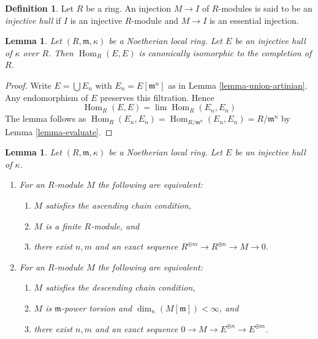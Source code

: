 \documentclass{amsart}
\theoremstyle{plain}
\newtheorem{lemma}[subsection]{Lemma}
\theoremstyle{definition}
\newtheorem{definition}[subsection]{Definition}
\theoremstyle{remark}
\numberwithin{equation}{subsection}
\def\lim{\mathop{\mathrm{lim}}\nolimits}
\def\Hom{\mathop{\mathrm{Hom}}\nolimits}
\begin{document}
\begin{definition}
\label{definition-injective-hull}
Let $R$ be a ring. An injection $M \to I$ of $R$-modules is said
to be an {\it injective hull} if $I$ is an injective $R$-module and
$M \to I$ is an essential injection.
\end{definition}

\begin{lemma}
\label{lemma-endos}
Let $(R, \mathfrak m, \kappa)$ be a Noetherian local ring.
Let $E$ be an injective hull of $\kappa$ over $R$. Then
$\Hom_R(E, E)$ is canonically isomorphic to the completion of $R$.
\end{lemma}

\begin{proof}
Write $E = \bigcup E_n$ with $E_n = E[\mathfrak m^n]$ as in
Lemma \ref{lemma-union-artinian}. Any endomorphism of $E$
preserves this filtration. Hence
$$
\Hom_R(E, E) = \lim \Hom_R(E_n, E_n)
$$
The lemma follows as
$\Hom_R(E_n, E_n) = \Hom_{R/\mathfrak m^n}(E_n, E_n) = R/\mathfrak m^n$
by Lemma \ref{lemma-evaluate}.
\end{proof}


\begin{lemma}
\label{lemma-describe-categories}
Let $(R, \mathfrak m, \kappa)$ be a Noetherian local ring.
Let $E$ be an injective hull of $\kappa$.
\begin{enumerate}
\item For an $R$-module $M$ the following are equivalent:
\begin{enumerate}
\item $M$ satisfies the ascending chain condition,
\item $M$ is a finite $R$-module, and
\item there exist $n, m$ and an exact sequence
$R^{\oplus m} \to R^{\oplus n} \to M \to 0$.
\end{enumerate}
\item For an $R$-module $M$ the following are equivalent:
\begin{enumerate}
\item $M$ satisfies the descending chain condition,
\item $M$ is $\mathfrak m$-power torsion and
$\dim_\kappa(M[\mathfrak m]) < \infty$, and
\item there exist $n, m$ and an exact sequence
$0 \to M \to E^{\oplus n} \to E^{\oplus m}$.
\end{enumerate}
\end{enumerate}
\end{lemma}
\end{document}
